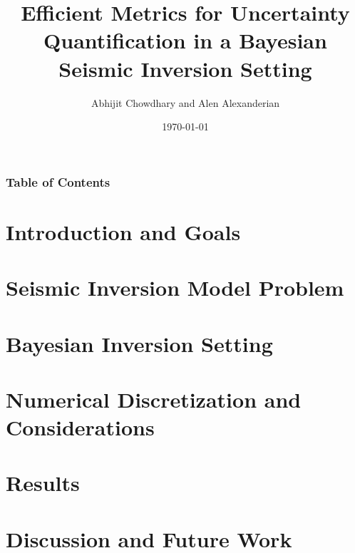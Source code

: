 \documentclass[
    pdf,
    11pt,
    xcolor={svgnames},
  ]{beamer}
\title[%
  Efficient UQ for Bayesian Seismic Inversion
]{%
  Efficient Metrics for Uncertainty Quantification in a Bayesian Seismic
  Inversion Setting
}
\author[Chowdhary, Alexanderian]{%
  Abhijit Chowdhary and Alen Alexanderian
}
\institute[NCSU]{
  Department of Mathematics \\
  North Carolina State University
}
\date[AMGSS 2022]{\today}
\begin{document}
 

\begin{frame}
  \frametitle{Table of Contents}
  \tableofcontents
\end{frame}

\section{Introduction and Goals}

\section{Seismic Inversion Model Problem}

\section{Bayesian Inversion Setting}

\section{Numerical Discretization and Considerations}

\section{Results}

\section{Discussion and Future Work}
\end{document}
